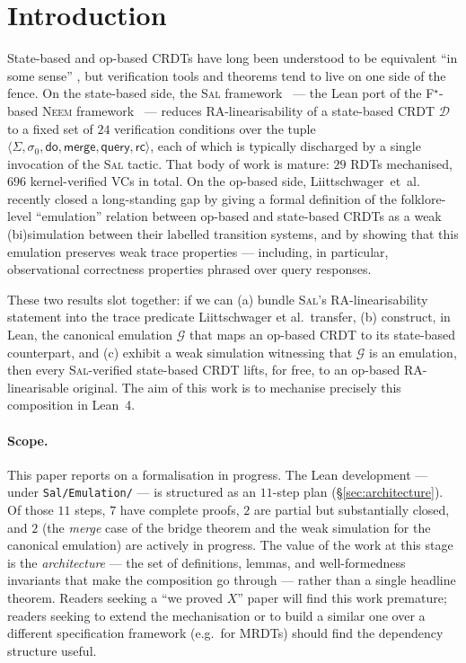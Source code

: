 \documentclass[11pt,a4paper]{article}
\theoremstyle{definition}
\theoremstyle{remark}
\newcommand{\RDT}{\ensuremath{\mathcal{D}}}
\newcommand{\mdo}{\mathsf{do}}
\newcommand{\mmerge}{\mathsf{merge}}
\newcommand{\mquery}{\mathsf{query}}
\newcommand{\mrc}{\mathsf{rc}}
\newcommand{\State}{\Sigma}
\newcommand{\init}{\sigma_0}
\newcommand{\Sal}{\textsc{Sal}}
\newcommand{\Emul}{\mathcal{G}}
\begin{document}
\section{Introduction}
\label{sec:intro}

State-based and op-based CRDTs have long been understood to be
equivalent ``in some sense'' \cite{shapiro-crdts}, but verification
tools and theorems tend to live on one side of the fence. On the
state-based side, the \Sal{} framework~\cite{sal2025} --- the Lean
port of the F$^{\star}$-based \textsc{Neem} framework~\cite{neem2025}
--- reduces RA-linearisability of a state-based CRDT $\RDT$ to a
fixed set of $24$ verification conditions over the tuple
$\langle \State, \init, \mdo, \mmerge, \mquery, \mrc\rangle$, each of
which is typically discharged by a single invocation of the \Sal{}
tactic. That body of work is mature: $29$ RDTs mechanised, $696$
kernel-verified VCs in total. On the op-based side,
Liittschwager~et~al.~\cite{liittschwager2025} recently closed a
long-standing gap by giving a formal definition of the
folklore-level ``emulation'' relation between op-based and state-based
CRDTs as a weak (bi)simulation between their labelled transition
systems, and by showing that this emulation preserves weak trace
properties --- including, in particular, observational correctness
properties phrased over query responses.

These two results slot together: if we can (a) bundle \Sal{}'s
RA-linearisability statement into the trace predicate Liittschwager
et al.\ transfer, (b) construct, in Lean, the canonical emulation
$\Emul$ that maps an op-based CRDT to its state-based counterpart,
and (c) exhibit a weak simulation witnessing that $\Emul$ is an
emulation, then every \Sal{}-verified state-based CRDT lifts, for
free, to an op-based RA-linearisable original. The aim of this work
is to mechanise precisely this composition in Lean~4.

\paragraph{Scope.}
This paper reports on a formalisation in progress. The Lean
development --- under \texttt{Sal/Emulation/} --- is structured as an
$11$-step plan (\S\ref{sec:architecture}). Of those $11$ steps, $7$
have complete proofs, $2$ are partial but substantially closed, and
$2$ (the \emph{merge} case of the bridge theorem and the weak
simulation for the canonical emulation) are actively in progress.
The value of the work at this stage is the \emph{architecture} --- the
set of definitions, lemmas, and well-formedness invariants that make
the composition go through --- rather than a single headline theorem.
Readers seeking a ``we proved $X$'' paper will find this work
premature; readers seeking to extend the mechanisation or to build a
similar one over a different specification framework (e.g.\ for
MRDTs) should find the dependency structure useful.
\end{document}

